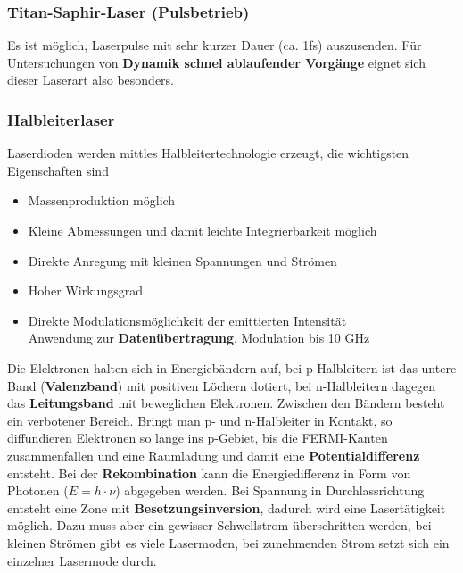\documentclass[12pt,a4paper,ngerman]{article}
\begin{document}
\subsubsection*{Titan-Saphir-Laser (Pulsbetrieb)}

Es ist möglich, Laserpulse mit sehr kurzer Dauer (ca. 1fs) auszusenden. Für Untersuchungen von \textbf{Dynamik schnel ablaufender Vorgänge} eignet sich dieser Laserart also besonders. 

\subsubsection{Halbleiterlaser}
Laserdioden werden mittles Halbleitertechnologie erzeugt, die wichtigsten Eigenschaften sind
\begin{itemize}
\item Massenproduktion möglich
\item Kleine Abmessungen und damit leichte Integrierbarkeit möglich
\item Direkte Anregung mit kleinen Spannungen und Strömen
\item Hoher Wirkungsgrad
\item Direkte Modulationsmöglichkeit der emittierten Intensität\\ Anwendung zur \textbf{Datenübertragung}, Modulation bis 10 GHz
\end{itemize}
Die Elektronen halten sich in Energiebändern auf, bei p-Halbleitern ist das untere Band (\textbf{Valenzband}) mit positiven Löchern dotiert, bei n-Halbleitern dagegen das \textbf{Leitungsband} mit beweglichen Elektronen. Zwischen den Bändern besteht ein verbotener Bereich. Bringt man p- und n-Halbleiter in Kontakt, so diffundieren Elektronen so lange ins p-Gebiet, bis die FERMI-Kanten zusammenfallen und eine Raumladung und damit eine \textbf{Potentialdifferenz} entsteht. 
Bei der \textbf{Rekombination} kann die Energiedifferenz in Form von Photonen ($E = h \cdot \nu$) abgegeben werden. Bei Spannung in Durchlassrichtung entsteht eine Zone mit \textbf{Besetzungsinversion}, dadurch wird eine Lasertätigkeit möglich. Dazu muss aber ein gewisser Schwellstrom überschritten werden, bei kleinen Strömen gibt es viele Lasermoden, bei zunehmenden Strom setzt sich ein einzelner Lasermode durch. 
\end{document}
